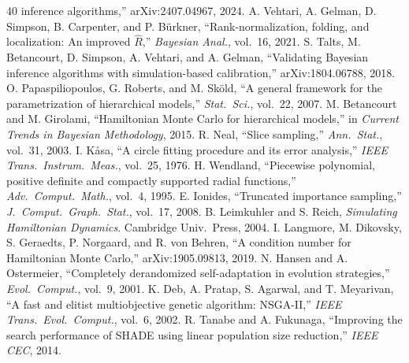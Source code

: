 \documentclass[10pt,journal,compsoc]{IEEEtran}
\begin{document}
\begin{thebibliography}{40}
inference algorithms,'' arXiv:2407.04967, 2024.
 A. Vehtari, A. Gelman, D. Simpson, B. Carpenter, and
P. B\"urkner, ``Rank-normalization, folding, and localization: An improved
$\widehat R$,'' \emph{Bayesian Anal.}, vol.~16, 2021.
 S. Talts, M. Betancourt, D. Simpson, A. Vehtari, and
A. Gelman, ``Validating Bayesian inference algorithms with
simulation-based calibration,'' arXiv:1804.06788, 2018.
 O. Papaspiliopoulos, G. Roberts, and
M. Sk\"old, ``A general framework for the parametrization of hierarchical
models,'' \emph{Stat.\ Sci.}, vol.~22, 2007.
 M. Betancourt and M. Girolami, ``Hamiltonian Monte
Carlo for hierarchical models,'' in \emph{Current Trends in Bayesian
Methodology}, 2015.
 R. Neal, ``Slice sampling,'' \emph{Ann.\ Stat.},
vol.~31, 2003.
 I. K\r{a}sa, ``A circle fitting procedure and its error
analysis,'' \emph{IEEE Trans.\ Instrum.\ Meas.}, vol.~25, 1976.
 H. Wendland, ``Piecewise polynomial, positive
definite and compactly supported radial functions,'' \emph{Adv.\ Comput.\
Math.}, vol.~4, 1995.
 E. Ionides, ``Truncated importance sampling,''
\emph{J.\ Comput.\ Graph.\ Stat.}, vol.~17, 2008.
 B. Leimkuhler and S. Reich, \emph{Simulating
Hamiltonian Dynamics}. Cambridge Univ.\ Press, 2004.
 I. Langmore, M. Dikovsky, S. Geraedts, P. Norgaard,
and R. von Behren, ``A condition number for Hamiltonian Monte Carlo,''
arXiv:1905.09813, 2019.
 N. Hansen and A. Ostermeier, ``Completely
derandomized self-adaptation in evolution strategies,'' \emph{Evol.\
Comput.}, vol.~9, 2001.
\bibitem{deb2002} K. Deb, A. Pratap, S. Agarwal, and T. Meyarivan, ``A fast
and elitist multiobjective genetic algorithm: NSGA-II,'' \emph{IEEE Trans.\
Evol.\ Comput.}, vol.~6, 2002.
\bibitem{tanabe2014} R. Tanabe and A. Fukunaga, ``Improving the search
performance of SHADE using linear population size reduction,'' \emph{IEEE
CEC}, 2014.
\end{thebibliography}
\end{document}
